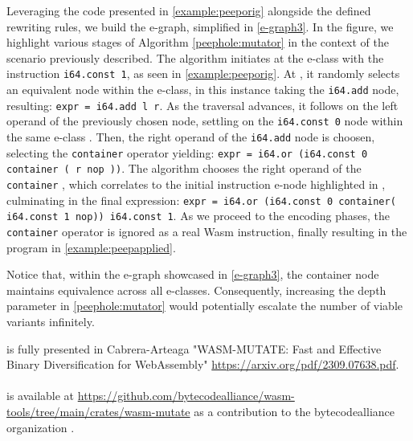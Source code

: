 Leveraging the code presented in \autoref{example:peeporig} alongside the defined rewriting rules, we build the e-graph, simplified in \autoref{e-graph3}.
In the figure, we highlight various stages of Algorithm \ref{peephole:mutator} in the context of the scenario previously described. 
The algorithm initiates at the e-class with the instruction \texttt{i64.const 1}, as seen in \autoref{example:peeporig}.
At , it randomly selects an equivalent node within the e-class, in this instance taking the \texttt{i64.add} node, resulting: {\texttt{expr = i64.add l r}}.
As the traversal advances, it follows on the left operand of the previously chosen node, settling on the \texttt{i64.const 0} node within the same e-class .
Then, the right operand of the \texttt{i64.add} node is choosen, selecting the \texttt{container}  operator yielding:
{\texttt{expr = i64.or (i64.const 0 container ( r nop ))}}.
The algorithm chooses the right operand of the \texttt{container} , which correlates to the initial instruction e-node highlighted in , culminating in the final expression:
{\texttt{expr = i64.or (i64.const 0 container( i64.const 1 nop))\ i64.const 1}}.
As we proceed to the encoding phases, the \texttt{container} operator is ignored as a real Wasm instruction, finally resulting in the program in \autoref{example:peepapplied}.

Notice that, within the e-graph showcased in \autoref{e-graph3}, the container node maintains equivalence across all e-classes. 
Consequently, increasing the depth parameter in \autoref{peephole:mutator} would potentially escalate the number of viable variants infinitely.



\begin{tcolorbox}[title=Contribution paper and artifact,boxrule=1pt,arc=.2em,boxsep=1.0mm]
  \tool is fully presented in Cabrera-Arteaga \etal "WASM-MUTATE: Fast and Effective Binary Diversification for WebAssembly"
 \url{https://arxiv.org/pdf/2309.07638.pdf}.
  \\\\
  \tool is available at \url{https://github.com/bytecodealliance/wasm-tools/tree/main/crates/wasm-mutate} as a contribution to the bytecodealliance organization .
\end{tcolorbox}